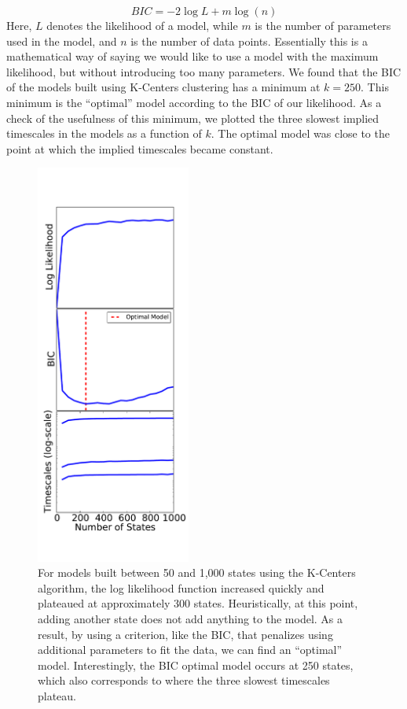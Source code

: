 \documentclass[twocolumn,floatfix,nofootinbib,aps]{revtex4-1}
\begin{document}
\begin{equation}
BIC = -2 \log L + m \log(n) 
\label{eq:bic}
\end{equation} Here, $L$ denotes the likelihood of a model, while $m$ is the number of parameters used in the model, and $n$ is the number of data points. Essentially this is a mathematical way of saying we would like to use a model with the maximum likelihood, but without introducing too many parameters. 
We found that the BIC of the models built using K-Centers clustering has a minimum at $k=250$. This minimum is the ``optimal'' model according to the BIC of our likelihood. As a check of the usefulness of this minimum, we plotted the three slowest implied timescales in the models as a function of $k$. The optimal model was close to the point at which the implied timescales became constant. 

\begin{figure}
\includegraphics[width=2in]{figs/like_comp.pdf}
\caption{For models built between 50 and 1,000 states using the K-Centers algorithm, the log likelihood function increased quickly and plateaued at approximately 300 states. Heuristically, at this point, adding another state does not add anything to the model. As a result, by using a criterion, like the BIC, that penalizes using additional parameters to fit the data, we can find an ``optimal'' model. Interestingly, the BIC optimal model occurs at 250 states, which also corresponds to where the three slowest timescales plateau.}
\label{fig:like_kcenters}
\end{figure}


\end{document}
